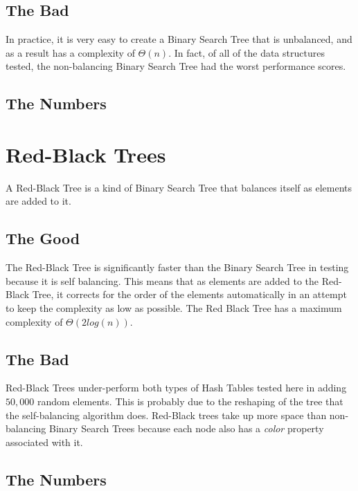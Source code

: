 \documentclass{muformallab}
\begin{document}
  \subsection{The Bad}

  In practice, it is very easy to create a Binary Search Tree that is
  unbalanced, and as a result has a complexity of $\Theta \left(
  n \right)$. In fact, of all of the data structures tested, the
  non-balancing Binary Search Tree had the worst performance scores.

  \subsection{The Numbers}


  \section{Red-Black Trees}

  A Red-Black Tree is a kind of Binary Search Tree that balances itself as
  elements are added to it.

  \subsection{The Good}

  The Red-Black Tree is significantly faster than the Binary Search Tree
  in testing because it is self balancing. This means that as elements are
  added to the Red-Black Tree, it corrects for the order of the elements
  automatically in an attempt to keep the complexity as low as possible.
  The Red Black Tree has a maximum complexity of $\Theta \left( 2 log
  \left( n \right) \right)$.

  \subsection{The Bad}

  Red-Black Trees under-perform both types of Hash Tables tested here in
  adding $50,000$ random elements. This is probably due to the reshaping
  of the tree that the self-balancing algorithm does. Red-Black trees take
  up more space than non-balancing Binary Search Trees because each node
  also has a \textit{color} property associated with it.

  \subsection{The Numbers}
\end{document}
